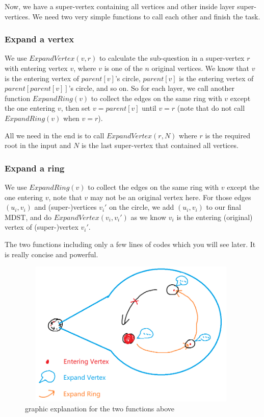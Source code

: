 \documentclass{article}
\begin{document}
Now, we have a super-vertex containing all vertices and other inside layer super-vertices. We need two very simple functions to call each other and finish the task.

\subsubsection{Expand a vertex}

We use $ExpandVertex(v,r)$ to calculate the sub-question in a super-vertex $r$ with entering vertex $v$, where $v$ is one of the $n$ original vertices. We know that $v$ is the entering vertex of $parent[v]$'s circle, $parent[v]$ is the entering vertex of $parent[parent[v]]$'s circle, and so on. So for each layer, we call another function $ExpandRing(v)$ to collect the edges on the same ring with $v$ except the one entering $v$, then set $v=parent[v]$ until $v=r$ (note that do not call $ExpandRing(v)$ when $v=r$).

All we need in the end is to call $ExpandVertex(r,N)$ where $r$ is the required root in the input and $N$ is the last super-vertex that contained all vertices.

\subsubsection{Expand a ring}

We use $ExpandRing(v)$ to collect the edges on the same ring with $v$ except the one entering $v$, note that $v$ may not be an original vertex here. For those edges $(u_i,v_i)$ and (super-)vertices $v_i'$ on the circle, we add $(u_i,v_i)$ to our final MDST, and do $ExpandVertex(v_i,v_i')$ as we know $v_i$ is the entering (original) vertex of (super-)vertex $v_i'$.

The two functions including only a few lines of codes which you will see later. It is really concise and powerful.

\begin{figure}
    \centering
    \includegraphics[height=7cm,width=11cm]{figure/figure2.png}
    \caption{graphic explanation for the two functions above}
    \label{2}
\end{figure}
\end{document}
